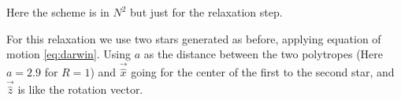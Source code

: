 \documentclass[notes.tex]{subfiles}
\begin{document}
Here the scheme is in $N^2$ but just for the relaxation step.

For this relaxation we use two stars generated as before, applying equation of motion \ref{eq:darwin}.
Using $a$ as the distance between the two polytropes  (Here $a=2.9$ for $R=1$) and $\vec{\hat{x}}$ going for the center of the first to the second star, and $\vec{\hat{z}}$ is like the rotation vector.

%


%
%
\end{document}
